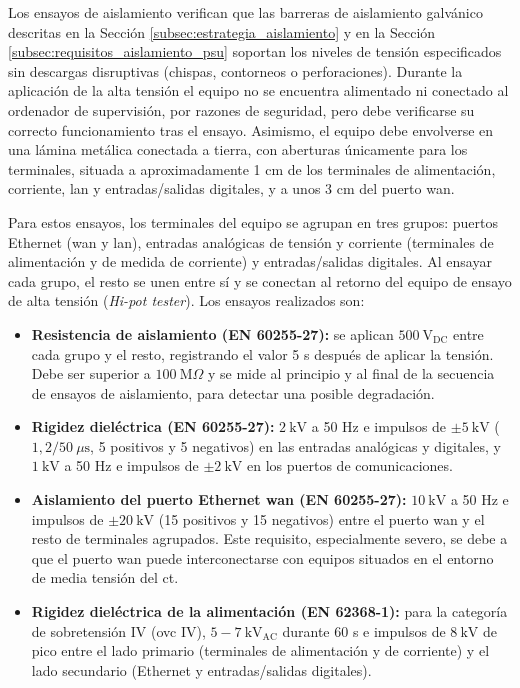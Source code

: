 Los ensayos de aislamiento verifican que las barreras de aislamiento galvánico descritas en la Sección \ref{subsec:estrategia_aislamiento} y en la Sección \ref{subsec:requisitos_aislamiento_psu} soportan los niveles de tensión especificados sin descargas disruptivas (chispas, contorneos o perforaciones). Durante la aplicación de la alta tensión el equipo no se encuentra alimentado ni conectado al ordenador de supervisión, por razones de seguridad, pero debe verificarse su correcto funcionamiento tras el ensayo. Asimismo, el equipo debe envolverse en una lámina metálica conectada a tierra, con aberturas únicamente para los terminales, situada a aproximadamente 1 cm de los terminales de alimentación, corriente, \gls{lan} y entradas/salidas digitales, y a unos 3 cm del puerto \gls{wan}.

Para estos ensayos, los terminales del equipo se agrupan en tres grupos: puertos Ethernet (\gls{wan} y \gls{lan}), entradas analógicas de tensión y corriente (terminales de alimentación y de medida de corriente) y entradas/salidas digitales. Al ensayar cada grupo, el resto se unen entre sí y se conectan al retorno del equipo de ensayo de alta tensión (\textit{Hi-pot tester}). Los ensayos realizados son:

\begin{itemize}
    \item \textbf{Resistencia de aislamiento (EN 60255-27):} se aplican $500\ \text{V}_{\text{DC}}$ entre cada grupo y el resto, registrando el valor 5 s después de aplicar la tensión. Debe ser superior a $100\ \text{M}\Omega$ y se mide al principio y al final de la secuencia de ensayos de aislamiento, para detectar una posible degradación.
    \item \textbf{Rigidez dieléctrica (EN 60255-27):} $2\ \text{kV}$ a 50 Hz e impulsos de $\pm 5\ \text{kV}$ ($1,2/50\ \mu\text{s}$, 5 positivos y 5 negativos) en las entradas analógicas y digitales, y $1\ \text{kV}$ a 50 Hz e impulsos de $\pm 2\ \text{kV}$ en los puertos de comunicaciones.
    \item \textbf{Aislamiento del puerto Ethernet \gls{wan} (EN 60255-27):} $10\ \text{kV}$ a 50 Hz e impulsos de $\pm 20\ \text{kV}$ (15 positivos y 15 negativos) entre el puerto \gls{wan} y el resto de terminales agrupados. Este requisito, especialmente severo, se debe a que el puerto \gls{wan} puede interconectarse con equipos situados en el entorno de media tensión del \gls{ct}.
    \item \textbf{Rigidez dieléctrica de la alimentación (EN 62368-1):} para la categoría de sobretensión IV (\gls{ovc} IV), $5-7\ \text{kV}_{\text{AC}}$ durante 60 s e impulsos de $8\ \text{kV}$ de pico entre el lado primario (terminales de alimentación y de corriente) y el lado secundario (Ethernet y entradas/salidas digitales).
\end{itemize}

